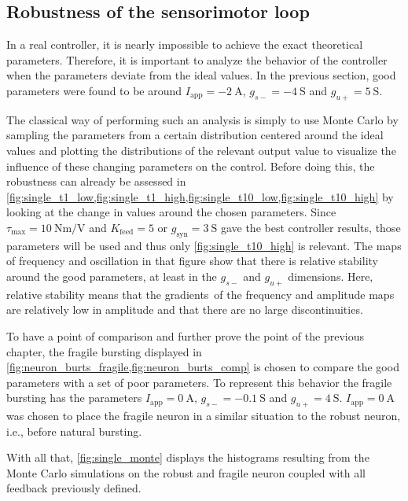 \subsection{Robustness of the sensorimotor loop}

In a real controller, it is nearly impossible to achieve the exact theoretical parameters.
Therefore, it is important to analyze the behavior of the controller when the parameters deviate from the ideal values.
In the previous section, good parameters were found to be around $I_\text{app} = \qty{-2}{\ampere}$, $g_{s-} = \qty{-4}{\siemens}$ and $g_{u+} = \qty{5}{\siemens}$. 

The classical way of performing such an analysis is simply to use Monte Carlo by sampling the parameters from a certain distribution centered around the ideal values and plotting the distributions of the relevant output value to visualize the influence of these changing parameters on the control.
Before doing this, the robustness can already be assessed in \cref{fig:single_t1_low,fig:single_t1_high,fig:single_t10_low,fig:single_t10_high} by looking at the change in values around the chosen parameters.
Since $\tau_\text{max}=\qty{10}{\newton\meter\per\volt}$ and $K_\text{feed} = 5$ or $g_{\text{syn}} = \qty{3}{\siemens}$ gave the best controller results, those parameters will be used and thus only \cref{fig:single_t10_high} is relevant.
The maps of frequency and oscillation in that figure show that there is relative stability around the good parameters, at least in the $g_{s-}$ and $g_{u+}$ dimensions.
Here, relative stability means that the gradients of the frequency and amplitude maps are relatively low in amplitude and that there are no large discontinuities.

To have a point of comparison and further prove the point of the previous chapter, the fragile bursting displayed in \cref{fig:neuron_burts_fragile,fig:neuron_burts_comp} is chosen to compare the good parameters with a set of poor parameters.
To represent this behavior the fragile bursting has the parameters $I_\text{app} = \qty{0}{\ampere}$, $g_{s-} = \qty{-0.1}{\siemens}$ and $g_{u+} = \qty{4}{\siemens}$. $I_\text{app} = \qty{0}{\ampere}$ was chosen to place the fragile neuron in a similar situation to the robust neuron, i.e., before natural bursting.

With all that, \cref{fig:single_monte} displays the histograms resulting from the Monte Carlo simulations on the robust and fragile neuron coupled with all feedback previously defined. 

